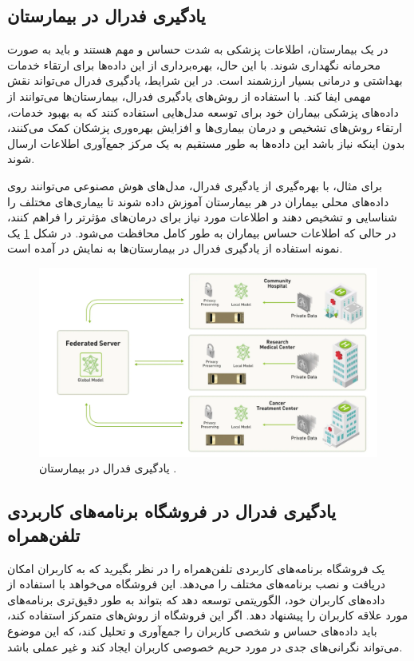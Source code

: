 \subsection{یادگیری فدرال در بیمارستان}
در یک بیمارستان، اطلاعات پزشکی به شدت حساس و مهم هستند و باید به صورت محرمانه نگهداری شوند. با این حال، بهره‌برداری از این داده‌ها برای ارتقاء خدمات بهداشتی و درمانی بسیار ارزشمند است. در این شرایط، یادگیری فدرال می‌تواند نقش مهمی ایفا کند. با استفاده از روش‌های یادگیری فدرال، بیمارستان‌ها می‌توانند از داده‌های پزشکی بیماران خود برای توسعه مدل‌هایی استفاده کنند که به بهبود خدمات، ارتقاء روش‌های تشخیص و درمان بیماری‌ها و افزایش بهره‌وری پزشکان کمک می‌کنند، بدون اینکه نیاز باشد این داده‌ها به طور مستقیم به یک مرکز جمع‌آوری اطلاعات ارسال شوند.

برای مثال، با بهره‌گیری از یادگیری فدرال، مدل‌های هوش مصنوعی می‌توانند روی داده‌های محلی بیماران در هر بیمارستان آموزش داده شوند تا بیماری‌های مختلف را شناسایی و تشخیص دهند و اطلاعات مورد نیاز برای درمان‌های مؤثرتر را فراهم کنند، در حالی که اطلاعات حساس بیماران به طور کامل محافظت می‌شود. در شکل
\ref{hospital}
یک نمونه استفاده از یادگیری فدرال در بیمارستان‌ها به نمایش در آمده است.


\begin{figure}[t]
	\centering
	\includegraphics[scale=1]{images/chap1/hospital.png}%
	\caption{%
		یادگیری فدرال در بیمارستان
		\cite{rieke2019what}%
		.
	}
	\label{hospital}
	\centering
\end{figure}



\subsection{یادگیری فدرال در فروشگاه برنامه‌های کاربردی تلفن‌همراه}

یک فروشگاه برنامه‌های کاربردی%
تلفن‌همراه را در نظر بگیرید که به کاربران امکان دریافت و نصب برنامه‌های مختلف را می‌دهد. این فروشگاه می‌خواهد با استفاده از داده‌های کاربران خود، الگوریتمی توسعه دهد که بتواند به طور دقیق‌تری برنامه‌های مورد علاقه کاربران را پیشنهاد دهد. اگر این فروشگاه از روش‌های متمرکز استفاده کند، باید داده‌های حساس و شخصی کاربران را جمع‌آوری و تحلیل کند، که این موضوع می‌تواند نگرانی‌های جدی در مورد حریم خصوصی کاربران ایجاد کند و غیر عملی باشد.

